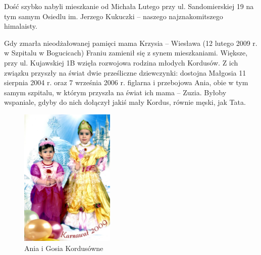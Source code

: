 Dość szybko nabyli mieszkanie od Michała Lutego przy ul. Sandomierskiej 19 na tym samym Osiedlu im. Jerzego Kukuczki – naszego najznakomitszego himalaisty.

Gdy zmarła nieodżałowanej pamięci mama Krzysia – Wiesława (12 lutego 2009 r. w Szpitalu w Bogucicach) Franiu zamienił się z synem mieszkaniami. Większe, przy ul. Kujawskiej 1B wzięła rozwojowa rodzina młodych Kordusów. Z ich związku przyszły na świat dwie prześliczne dziewczynki: dostojna Małgosia 11 sierpnia 2004 r. oraz 7 września 2006 r. figlarna i przebojowa Ania, obie w tym samym szpitalu, w którym przyszła na świat ich mama – Zuzia. Byłoby wspaniale, gdyby do nich dołączył jakiś mały Kordus, równie męski, jak Tata.
\begin{figure}[!h]
\begin{center}
\includegraphics[width=0.4\textwidth]{photo/gosia_ania_kordus_1.jpg}
\caption{Ania i Gosia Kordusówne}
\end{center}
\end{figure}

